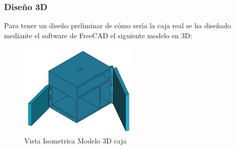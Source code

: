\subsubsection{Diseño 3D}

Para tener un diseño preliminar de cómo sería la caja real se ha diseñado mediante el software de FreeCAD el siguiente modelo en 3D:

\begin{figure}[H]
    \centering
    \includegraphics[width=0.5\textwidth]{images/4-DesarrolloTeorico/4-1-caja/CAJA_3D_ISOMETRICA.png}
    \caption{Vista Isometrica Modelo 3D caja}
    \label{fig:DesarrolloTeorico/Caja/CAJA_3D_ISOMETRICA}
\end{figure}

